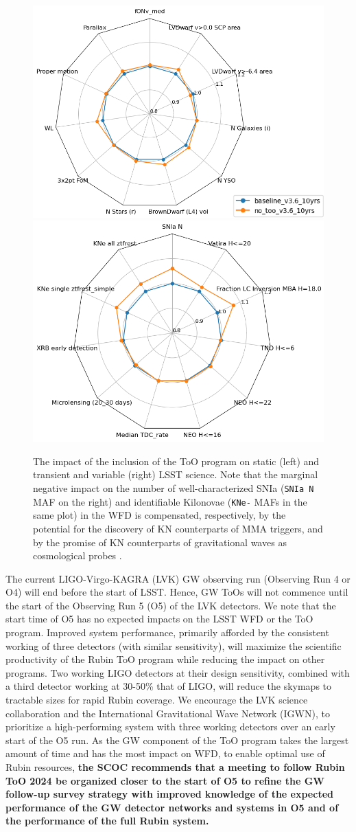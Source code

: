 \begin{figure}
  \centering
    \includegraphics[height=0.38\linewidth]{figures/baseline_v36_wfd_static.png}\includegraphics[height=0.38\linewidth]{figures/baseline_v36_wfd_transient.png}
    \caption{The impact of the inclusion of the ToO program on static (left) and transient and variable (right) LSST science. Note that the marginal negative impact on the number of well-characterized SNIa (\texttt{SNIa N} MAF on the right) and identifiable Kilonovae (\texttt{KNe-} MAFs in the same plot) in the WFD is compensated, respectively, by the potential for the discovery of KN counterparts of MMA triggers, and by the promise of KN counterparts of gravitational waves as cosmological probes \citep[\eg ,][]{PhysRevResearch.2.022006, gianfagna2024potential}.}
    \label{fig:too}
\end{figure}


The current LIGO-Virgo-KAGRA (LVK) GW observing run (Observing Run 4 or O4) will end before the start of LSST. Hence, GW ToOs will not commence until the start of the Observing Run 5 (O5) of the LVK detectors. We note that the start time of O5 has no expected impacts on the LSST WFD or the ToO program. Improved system performance, primarily afforded by the consistent working of three detectors (with similar sensitivity), will maximize the scientific productivity of the Rubin ToO program while reducing the impact on other programs. Two working LIGO detectors at their design sensitivity, combined with a third detector working at 30-50\% that of LIGO, will reduce the skymaps to tractable sizes for rapid Rubin coverage. We encourage the LVK science collaboration and the International Gravitational Wave Network (IGWN), to prioritize a high-performing system with three working detectors over an early start of the O5 run. 
As the GW component of the ToO program takes the largest amount of time and has the most impact on WFD, to enable optimal use of Rubin resources, {\bf the SCOC recommends that a meeting to follow Rubin ToO 2024 be organized closer to the start of O5 to refine the GW follow-up survey strategy with improved knowledge of the expected performance of the GW detector networks and systems in O5 and of the performance of the full Rubin system.}
%

